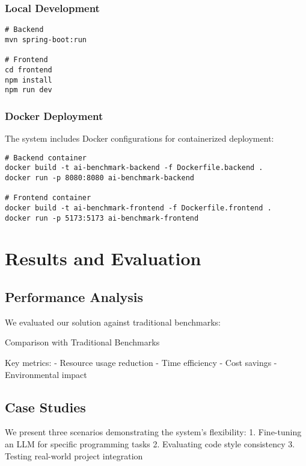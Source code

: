 \subsection{Local Development}
\begin{verbatim}
# Backend
mvn spring-boot:run

# Frontend
cd frontend
npm install
npm run dev
\end{verbatim}

\subsection{Docker Deployment}
The system includes Docker configurations for containerized deployment:

\begin{verbatim}
# Backend container
docker build -t ai-benchmark-backend -f Dockerfile.backend .
docker run -p 8080:8080 ai-benchmark-backend

# Frontend container
docker build -t ai-benchmark-frontend -f Dockerfile.frontend .
docker run -p 5173:5173 ai-benchmark-frontend
\end{verbatim}

\chapter{Results and Evaluation}

\section{Performance Analysis}

We evaluated our solution against traditional benchmarks:

\begin{table}[h]
    \centering
    \caption{Comparison with Traditional Benchmarks}
    \label{tab:comparison}
\end{table}

Key metrics:
- Resource usage reduction
- Time efficiency
- Cost savings
- Environmental impact

\section{Case Studies}

We present three scenarios demonstrating the system's flexibility:
1. Fine-tuning an LLM for specific programming tasks
2. Evaluating code style consistency
3. Testing real-world project integration

